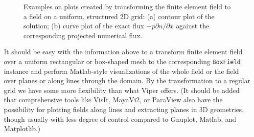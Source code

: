 \begin{figure}
  \centerline{
}
  \centerline{
}
  \caption{\label{langtangen:poisson:2D:fig2}
  Examples on plots created by transforming the finite element field to
  a field on a uniform, structured 2D grid:
  (a) contour plot of the solution; (b) curve plot of the exact flux
  $-p\partial u/\partial x$ against the corresponding projected numerical flux.
  }
\end{figure}

It should be easy with the information above to a transform finite element
field over a uniform rectangular or box-shaped mesh to the corresponding
{\fontsize{12pt}{12pt}\texttt{BoxField}} instance and perform Matlab-style
visualizations of the whole field or
the field over planes or along lines through the domain.
By the transformation to a regular grid we have some more flexibility
than what Viper offers. (It should be added that
comprehensive tools like
VisIt, MayaVi2, or ParaView also have the possibility for plotting fields
along lines and extracting planes in 3D geometries, though usually with
less degree of control compared to Gnuplot, Matlab, and Matplotlib.)

